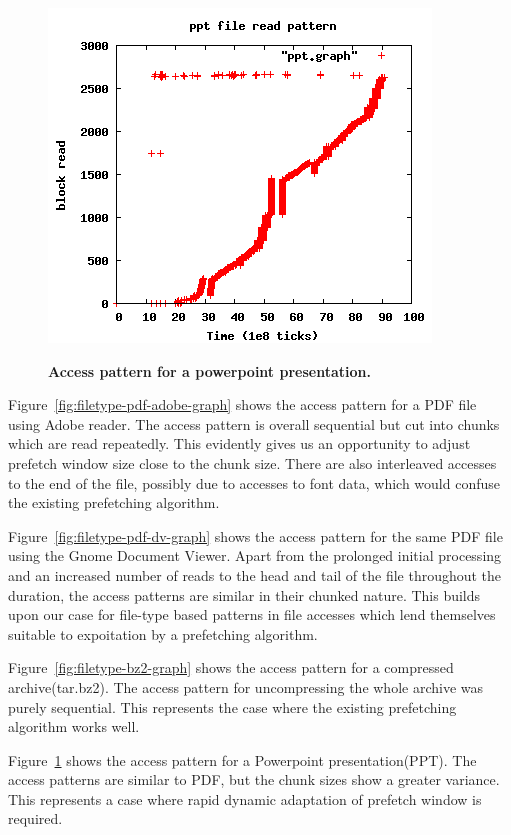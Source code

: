\documentclass[twocolumn,10pt]{article}
\begin{document}
\begin{figure}[t!!]
\centering \resizebox{!}{2.8in}
{\includegraphics{filetype-ppt-graph.png}}
\caption{\small \bf Access pattern for a powerpoint presentation.}
\label{fig:filetype-ppt-graph}
\end{figure}

Figure~\ref{fig:filetype-pdf-adobe-graph} shows the access pattern for a PDF file using
Adobe reader. The access pattern is overall sequential but cut into chunks which are read repeatedly. This evidently gives us an opportunity to adjust prefetch window size close to the chunk size. There are also interleaved accesses to the end of the file, possibly due to accesses to font data, which would confuse the existing prefetching algorithm.

Figure~\ref{fig:filetype-pdf-dv-graph} shows the access pattern for the same PDF file
using the Gnome Document Viewer. Apart from the prolonged initial processing and an
increased number of reads to the head and tail of the file throughout the duration, the
access patterns are similar in their chunked nature. This builds upon our case for 
file-type based patterns in file accesses which lend themselves suitable to expoitation
by a prefetching algorithm.

Figure~\ref{fig:filetype-bz2-graph} shows the access pattern for a compressed archive(tar.bz2). The access pattern for
uncompressing the whole archive was purely sequential. This represents the case where
the existing prefetching algorithm works well.

Figure~\ref{fig:filetype-ppt-graph} shows the access pattern for a Powerpoint presentation(PPT). The access patterns
are similar to PDF, but the chunk sizes show a greater variance. This represents a 
case where rapid dynamic adaptation of prefetch window is required.
\end{document}
